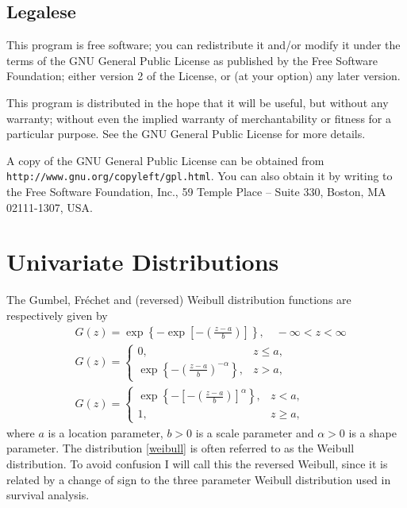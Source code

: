 \documentclass[11pt,a4paper]{article}
\begin{document}
\subsection{Legalese}

This program is free software; you can redistribute it and/or
modify it under the terms of the GNU General Public License
as published by the Free Software Foundation; either version 2
of the License, or (at your option) any later version.

This program is distributed in the hope that it will be useful,
but without any warranty; without even the implied warranty of
merchantability or fitness for a particular purpose.  
See the GNU General Public License for more details.

A copy of the GNU General Public License can be obtained from 
\verb+http://www.gnu.org/copyleft/gpl.html+.
You can also obtain it by writing to the Free Software Foundation, 
Inc., 59 Temple Place -- Suite 330, Boston, MA 02111-1307, USA. 

\section{Univariate Distributions}
\setcounter{footnote}{0}
\label{uni}

The Gumbel, Fr\'{e}chet and (reversed) Weibull distribution functions are respectively given by
\begin{align}
&G(z) = \exp\left\{-\exp\left[-\left(\frac{z-a}{b}\right)\right]\right\}, 
        \quad -\infty < z < \infty \label{gumbel} \\
&G(z) = \begin{cases}
        0, & z \leq a, \\
        \exp\left\{-\left(\frac{z-a}{b}\right)^{-\alpha}\right\}, & z > a,
        \end{cases} \label{frechet} \\ 
&G(z) = \begin{cases}
        \exp\left\{-\left[-\left(\frac{z-a}{b}\right)\right]^{\alpha}\right\},
        & z < a, \\
        1, & z \geq a,
        \end{cases} \label{weibull}
\end{align}
where $a$ is a location parameter, $b > 0$ is a scale parameter and $\alpha > 0$ is a shape parameter. 
The distribution \eqref{weibull} is often referred to as the Weibull distribution. 
To avoid confusion I will call this the reversed Weibull, since it is related  by a change of sign to the three parameter Weibull distribution used in survival analysis.
\end{document}
